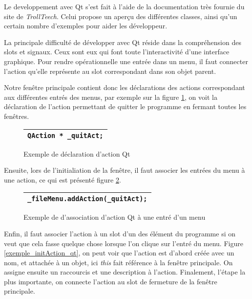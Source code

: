 \par
Le developpement avec Qt s'est fait \`a l'aide de la documentation tr\`es fournie du site de \textit{TrollTeech}. Celui propose un aper\c cu des diff\'erentes classes, ainsi qu'un certain nombre d'exemples pour aider les d\'eveloppeur.
\par
La principale difficult\'e de d\'evelopper avec Qt r\'eside dans la compr\'ehension des slots et signaux. Ceux sont eux qui font toute l'interactivit\'e d'une interface graphique. Pour rendre op\'erationnelle une entr\'ee dans un menu, il faut connecter l'action qu'elle repr\'esente au slot correspondant dans son objet parent.
\par
Notre fen\^etre principale contient donc les d\'eclarations des actions correspondant aux diff\'erentes entr\'es des menus, par exemple sur la figure \ref{exemple_action_qt}, on voit la d\'eclaration de l'action permettant de quitter le programme en fermant toutes les fen\^etres.
\begin{figure}[ht]
   \begin{center}
      \begin{tabular}{l}
         \hline
         \verb|QAction * _quitAct;|\\
         \hline
      \end{tabular}
   \end{center}
\caption{\label{exemple_action_qt} Exemple de d\'eclaration d'action Qt}
\end{figure}
Ensuite, lors de l'initialiation de la fen\^etre, il faut associer les 
entr\'ees du menu \`a une action, ce qui est pr\'esent\'e figure \ref{exemple_menu_qt}.

\begin{figure}[ht]
   \begin{center}
      \begin{tabular}{l}
         \hline
         \verb|_fileMenu.addAction(_quitAct);|\\
         \hline
      \end{tabular}
   \end{center}
\caption{\label{exemple_menu_qt} Exemple de d'association d'action Qt \`a une entr\'e d'un menu}
\end{figure}

Enfin, il faut associer l'action \`a un slot d'un des \'el\'ement du programme si on veut que cela fasse quelque chose lorsque l'on clique sur l'entr\'e du menu. Figure \ref{exemple_initAction_qt}, on peut voir que l'action est d'abord cr\'e\'ee avec un nom, et attach\'ee \`a un objet, ici \textit{this} fait r\'ef\'erence \`a la fen\^etre principale. On assigne ensuite un raccourcis et une description \`a l'action. Finalement, l'\'etape la plus importante, on connecte l'action au slot de fermeture de la fen\^etre principale.

